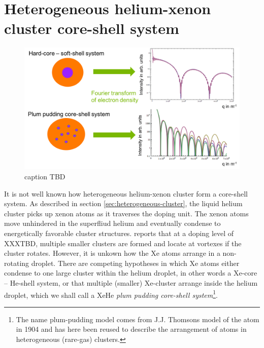 \section{Heterogeneous helium-xenon cluster core-shell system}\label{sec:helium-data}
\begin{figure}
 	\centering
 		\includegraphics[width=1.00\textwidth]{images/results/plum-pudding.png}
 	\caption{caption TBD}
 	\label{fig:HeXe-plum-pudding}
\end{figure}
It is not well known how heterogeneous helium-xenon cluster form a core-shell system. As described in section \ref{sec:heterogeneous-cluster}, the liquid helium cluster picks up xenon atoms as it traverses the doping unit. The xenon atoms move unhindered in the superfliud helium and eventually condense to energetically favorable cluster structures. \citep{Gomez-2014-Science} reports that at a doping level of XXXTBD, multiple smaller clusters are formed and locate at vortexes if the cluster rotates. However, it is unkown how the Xe atoms arrange in a non-rotating droplet. There are competing hypotheses in which Xe atoms either condense to one large cluster within the helium droplet, in other words a Xe-core -- He-shell system, or that multiple (smaller) Xe-cluster arrange inside the helium droplet, which we shall call a XeHe \textit{plum pudding core-shell system}\footnote{The name plum-pudding model comes from J.J. Thomsons model of the atom in 1904 and has here been reused to describe the arrangement of atoms in heterogeneous (rare-gas) clusters.}.
